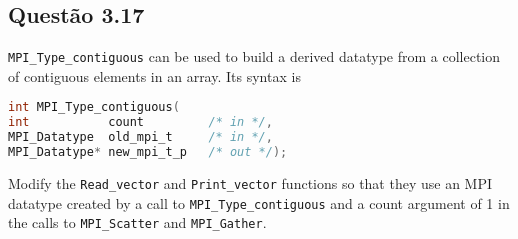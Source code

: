 

\subsection{Questão 3.17}

\texttt{MPI\_Type\_contiguous} can be used to build a derived datatype from a collection of contiguous elements in an array. Its syntax is

\begin{lstlisting}[language=C]
int MPI_Type_contiguous(
int           count         /* in */,
MPI_Datatype  old_mpi_t     /* in */,
MPI_Datatype* new_mpi_t_p   /* out */);
\end{lstlisting}

Modify the \texttt{Read\_vector} and \texttt{Print\_vector} functions so that they use an MPI datatype created by a call to \texttt{MPI\_Type\_contiguous} and a count
argument of 1 in the calls to \texttt{MPI\_Scatter} and \texttt{MPI\_Gather}.\\





